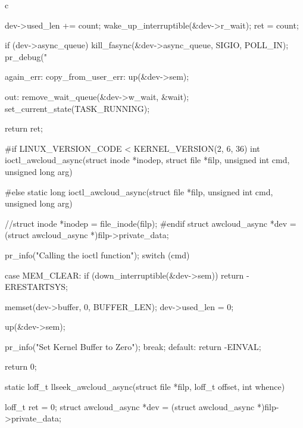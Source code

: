 \begin{code-block}{c}
{        dev->used_len += count;
        wake_up_interruptible(&dev->r_wait);
        ret = count;

        if (dev->async_queue) {
                kill_fasync(&dev->async_queue, SIGIO, POLL_IN);
                pr_debug("%
        }

again_err:
copy_from_user_err:
        up(&dev->sem);

out:
        remove_wait_queue(&dev->w_wait, &wait);
        set_current_state(TASK_RUNNING);

        return ret;
}

#if LINUX_VERSION_CODE < KERNEL_VERSION(2, 6, 36)
int ioctl_awcloud_async(struct inode *inodep,
        struct file *filp, unsigned int cmd, unsigned long arg)
{
#else
static long ioctl_awcloud_async(struct file *filp,
        unsigned int cmd, unsigned long arg)
{
        //struct inode *inodep = file_inode(filp);
#endif
        struct awcloud_async *dev = (struct awcloud_async *)filp->private_data;

        pr_info("Calling the ioctl function\n");
        switch (cmd) {
        case MEM_CLEAR:
                if (down_interruptible(&dev->sem)) {
                        return -ERESTARTSYS;
                }

                memset(dev->buffer, 0, BUFFER_LEN);
                dev->used_len = 0;

                up(&dev->sem);

                pr_info("Set Kernel Buffer to Zero\n");
                break;
        default:
                return -EINVAL;
        }
        return 0;
}

static loff_t llseek_awcloud_async(struct file *filp,
        loff_t offset, int whence)
{
        loff_t ret = 0;
        struct awcloud_async *dev = (struct awcloud_async *)filp->private_data;

}}
\end{code-block}
